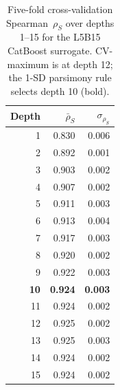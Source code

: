 \begin{table}[ht]
\caption{Five-fold cross-validation Spearman~$\rho_S$ over depths 1--15 for the L5B15 CatBoost surrogate. CV-maximum is at depth 12; the 1-SD parsimony rule selects depth 10 (bold).}
\label{tab:depth_sensitivity}
\centering
\begin{tabular}{rrr}
\toprule
Depth & $\bar{\rho}_S$ & $\sigma_{\rho_S}$ \\
\midrule
1 & 0.830 & 0.006 \\
2 & 0.892 & 0.001 \\
3 & 0.903 & 0.002 \\
4 & 0.907 & 0.002 \\
5 & 0.911 & 0.003 \\
6 & 0.913 & 0.004 \\
7 & 0.917 & 0.003 \\
8 & 0.920 & 0.002 \\
9 & 0.922 & 0.003 \\
\textbf{10} & \textbf{0.924} & \textbf{0.003} \\
11 & 0.924 & 0.002 \\
12 & 0.925 & 0.002 \\
13 & 0.925 & 0.003 \\
14 & 0.924 & 0.002 \\
15 & 0.924 & 0.002 \\
\bottomrule
\end{tabular}
\end{table}
